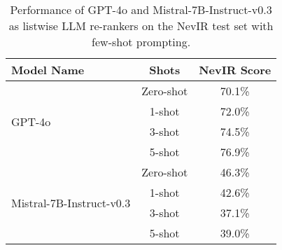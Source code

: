 \begin{table}[tbp]
  \caption{Performance of GPT-4o and Mistral-7B-Instruct-v0.3 as listwise LLM re-rankers on the NevIR test set with few-shot prompting.}
  \label{tab:few_shot}
  \centering
  \begin{tabular}{lcc}
    \toprule
    \textbf{Model Name} & \textbf{Shots} & \textbf{NevIR Score} \\
    \midrule
    \multirow{4}{*}{GPT-4o} & Zero-shot & 70.1\% \\
                             & 1-shot    & 72.0\% \\
                             & 3-shot    & 74.5\% \\
                             & 5-shot    & 76.9\% \\
    \midrule
    \multirow{4}{*}{Mistral-7B-Instruct-v0.3} & Zero-shot & 46.3\% \\
                                              & 1-shot    & 42.6\% \\
                                              & 3-shot    & 37.1\% \\
                                              & 5-shot    & 39.0\% \\
    \bottomrule
  \end{tabular}
\end{table}


    
